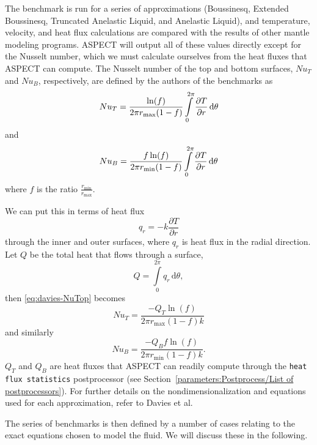 \documentclass{article}
\newcommand{\aspect}{\textsc{ASPECT}}
\begin{document}
The benchmark is run for a series of approximations (Boussinesq, Extended Boussinesq,
Truncated Anelastic Liquid, and Anelastic Liquid), and temperature, velocity, and heat flux
calculations are compared with the results of other mantle modeling programs. \aspect{}
will output all of these values directly except for the Nusselt number, which
we must calculate ourselves from the heat fluxes that \aspect{} can compute.
The Nusselt number of the top and bottom surfaces, ${Nu}_T$ and ${Nu}_B$,
respectively, are defined by the authors of the benchmarks as
\begin{equation}
\label{eq:davies-NuTop}
{Nu}_{T} = \frac{\ln(f)}{2{\pi}r_{\max}(1-f)}\int \limits_{0}^{2\pi} \frac{\partial T}{\partial r}\, \text{d}\theta  \\
\end{equation}
and
\begin{equation*}
\label{eq:davies-NuBottom}
{Nu}_{B} = \frac{f \ln(f)}{2{\pi}r_{\min}(1-f)}\int \limits_{0}^{2\pi} \frac{\partial T}{\partial r}\, \text{d}\theta \\
\end{equation*}
where $f$ is the ratio $\frac{r_{\min}}{r_{\max}}$.

We can put this in terms of heat flux
\begin{equation*}
  q_r = -k\frac{\partial T}{\partial r}
\end{equation*}
through the inner and outer surfaces,
where $q_r$ is heat flux in the radial direction. Let $Q$ be the total heat that flows through a surface,
\begin{equation*}
  Q = \int \limits_{0}^{2\pi} q_r\, \text{d}\theta,
\end{equation*}
then \eqref{eq:davies-NuTop} becomes
\begin{equation*}
  {Nu}_{T} = \frac{-Q_{T}\ln(f)}{2\pi{r_{\max}}(1-f)k}
\end{equation*}
and similarly
\begin{equation*}
  {Nu}_{B} = \frac{-Q_{B}f\ln(f)}{2\pi{r_{\min}}(1-f)k}.
\end{equation*}
$Q_T$ and $Q_B$ are heat fluxes that \aspect{} can readily compute through the
\texttt{heat flux statistics} postprocessor (see
Section~\ref{parameters:Postprocess/List of postprocessors}).
For further details on the nondimensionalization and equations used for each
approximation, refer to Davies et al.

The series of benchmarks is then defined by a number of cases relating to the
exact equations chosen to model the fluid. We will discuss these in the
following.
\end{document}
